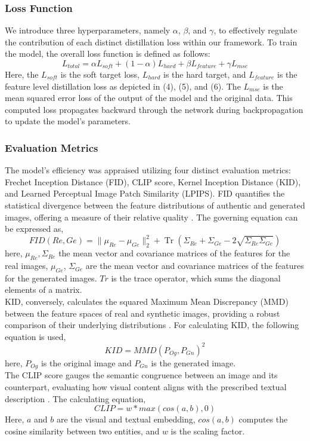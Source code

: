 \documentclass[a4paper,fleqn]{ieeetj}
\begin{document}
\subsubsection{Loss Function}
We introduce three hyperparameters, namely $\alpha$, $\beta$, and $\gamma$, to effectively regulate the contribution of each distinct distillation loss within our framework. To train the model, the overall loss function is defined as follows:
\begin{equation}
    L_{total}=\alpha L_{soft}+(1-\alpha) L_{hard}+\beta L_{feature}+ \gamma L_{mse}
\end{equation}
Here, the $L_{soft}$ is the soft target loss, $L_{hard}$ is the hard target, and $L_{feature}$ is the feature level distillation loss as depicted in (4), (5), and (6). The $L_{mse}$ is the mean squared error loss of the output of the model and the original data. This computed loss propagates backward through the network during backpropagation to update the model's parameters.
\subsubsection{Evaluation Metrics}
The model's efficiency was appraised utilizing four distinct evaluation metrics: Frechet Inception Distance (FID), CLIP score, Kernel Inception Distance (KID), and Learned Perceptual Image Patch Similarity (LPIPS). FID quantifies the statistical divergence between the feature distributions of authentic and generated images, offering a measure of their relative quality \cite{nunn2021compound}. The governing equation can be expressed as,
\begin{equation}
FID(Re, Ge) = \|\mu_{Re} - \mu_{Ge}\|_2^2 + \operatorname{Tr}(\Sigma_{Re} + \Sigma_{Ge} - 2\sqrt{\Sigma_{Re} \Sigma_{Ge}})
\end{equation}
here, $\mu_{Re}, \Sigma_{Re}$ the mean vector and covariance matrices of the features for the real images, $\mu_{Ge}$, $\Sigma_{Ge}$ are the mean vector and covariance matrices of the features for the generated images. $Tr$ is the trace operator, which sums the diagonal elements of a matrix.\\
KID, conversely, calculates the squared Maximum Mean Discrepancy (MMD) between the feature spaces of real and synthetic images, providing a robust comparison of their underlying distributions \cite{horak2021topology}. For calculating KID, the following equation is used,
\begin{equation}
    KID=MMD(P_{Og},P_{Gn})^2
\end{equation}
here, $P_{Og}$ is the original image and $P_{Gn}$ is the generated image.\\
The CLIP score gauges the semantic congruence between an image and its counterpart, evaluating how visual content aligns with the prescribed textual description \cite{wang2023exploring}. The calculating equation,
\begin{equation}
    CLIP=w*max(cos(a,b),0)
\end{equation}
Here, $a$ and $b$ are the visual and textual embedding, $cos(a,b)$ computes the cosine similarity between two entities, and $w$ is the scaling factor.
\end{document}
